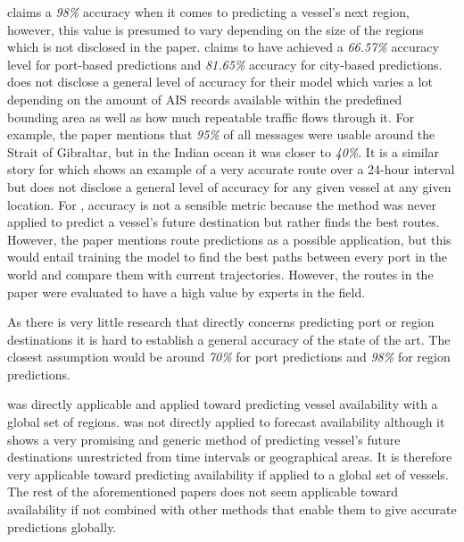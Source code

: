 
\cite{lechtenberg2019} claims a \textit{98\%} accuracy when it comes to predicting a vessel’s next region, however, this value is presumed to vary depending on the size of the regions which is not disclosed in the paper. \cite{Zhang2020AISApproach} claims to have achieved a \textit{66.57\%} accuracy level for port-based predictions and \textit{81.65\%} accuracy for city-based predictions. \cite{pallotta} does not disclose a general level of accuracy for their model which varies a lot depending on the amount of AIS records available within the predefined bounding area as well as how much repeatable traffic flows through it. For example, the paper mentions that \textit{95\%} of all messages were usable around the Strait of Gibraltar, but in the Indian ocean it was closer to \textit{40\%}. It is a similar story for \cite{Daranda2016NeuralNA} which shows an example of a very accurate route over a 24-hour interval but does not disclose a general level of accuracy for any given vessel at any given location. For \cite{Pelizzari2016GeneticAF}, accuracy is not a sensible metric because the method was never applied to predict a vessel’s future destination but rather finds the best routes. However, the paper mentions route predictions as a possible application, but this would entail training the model to find the best paths between every port in the world and compare them with current trajectories. However, the routes in the paper were evaluated to have a high value by experts in the field.

As there is very little research that directly concerns predicting port or region destinations it is hard to establish a general accuracy of the state of the art. The closest assumption would be around \textit{70\%} for port predictions and \textit{98\%} for region predictions.


\cite{lechtenberg2019} was directly applicable and applied toward predicting vessel availability with a global set of regions. \cite{Zhang2020AISApproach} was not directly applied to forecast availability although it shows a very promising and generic method of predicting vessel’s future destinations unrestricted from time intervals or geographical areas. It is therefore very applicable toward predicting availability if applied to a global set of vessels. The rest of the aforementioned papers does not seem applicable toward availability if not combined with other methods that enable them to give accurate predictions globally.

